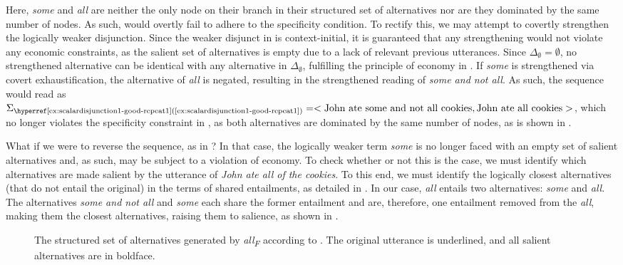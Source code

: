 Here, \textit{some} and \textit{all} are neither the only node on their branch in their structured set of alternatives nor are they dominated by the same number of nodes. As such,  would overtly fail to adhere to the specificity condition. To rectify this, we may attempt to covertly strengthen the logically weaker disjunction. Since the weaker disjunct in  is context-initial, it is guaranteed that any strengthening would not violate any economic constraints, as the salient set of alternatives is empty due to a lack of relevant previous utterances. Since $\Delta_\emptyset=\emptyset$, no strengthened alternative can be identical with any alternative in $\Delta_\emptyset$, fulfilling the principle of economy in . If \textit{some} is strengthened via covert exhaustification, the alternative of \textit{all} is negated, resulting in the strengthened reading of \textit{some and not all}. As such, the sequence would read as $\Sigma_\text{\refex{scalardisjunction1-good-repeat1}}=<\text{{John ate some and not all cookies}},\text{{John ate all cookies}}>$, which no longer violates the specificity constraint in , as both alternatives are dominated by the same number of nodes, as is shown in .

What if we were to reverse the sequence, as in ? In that case, the logically weaker term \textit{some} is no longer faced with an empty set of salient alternatives and, as such, may be subject to a violation of economy. To check whether or not this is the case, we must identify which alternatives are made salient by the utterance of \textit{John ate all of the cookies}. To this end, we must identify the logically closest alternatives (that do not entail the original) in the terms of shared entailments, as detailed in . In our case, \textit{all} entails two alternatives: \textit{some} and \textit{all}. The alternatives \textit{some and not all} and \textit{some} each share the former entailment and are, therefore, one entailment removed from the \textit{all}, making them the closest alternatives, raising them to salience, as shown in .
\begin{figure}[!htb]
    \centering\hspace{-6cm}
    
    \caption{The structured set of alternatives generated by \textit{all\textsubscript{F}} according to \textcite{Ippolito2020}. The original utterance is underlined, and all salient alternatives are in boldface.}
\end{figure}

